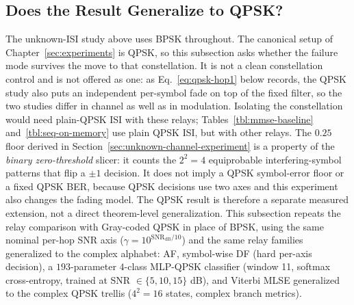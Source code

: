 \subsection{Does the Result Generalize to QPSK?}\label{sec:qpsk-unknown-channel}

The unknown-ISI study above uses BPSK throughout. The canonical setup of Chapter~\ref{sec:experiments} is QPSK, so this subsection asks whether the failure mode survives the move to that constellation. It is not a clean constellation control and is not offered as one: as Eq.~\eqref{eq:qpsk-hop1} below records, the QPSK study also puts an independent per-symbol fade on top of the fixed filter, so the two studies differ in channel as well as in modulation. Isolating the constellation would need plain-QPSK ISI with these relays; Tables~\ref{tbl:mmse-baseline} and~\ref{tbl:seq-on-memory} use plain QPSK ISI, but with other relays. The $0.25$ floor derived in Section~\ref{sec:unknown-channel-experiment} is a property of the \emph{binary zero-threshold} slicer: it counts the $2^{2}=4$ equiprobable interfering-symbol patterns that flip a $\pm1$ decision. It does not imply a QPSK symbol-error floor or a fixed QPSK BER, because QPSK decisions use two axes and this experiment also changes the fading model. The QPSK result is therefore a separate measured extension, not a direct theorem-level generalization. This subsection repeats the relay comparison with Gray-coded QPSK in place of BPSK, using the same nominal per-hop SNR axis ($\gamma=10^{\text{SNR}_{\text{dB}}/10}$) and the same relay families generalized to the complex alphabet: AF, symbol-wise DF (hard per-axis decision), a $193$-parameter $4$-class MLP-QPSK classifier (window 11, softmax cross-entropy, trained at SNR $\in\{5,10,15\}$ dB), and Viterbi MLSE generalized to the complex QPSK trellis ($4^{2}=16$ states, complex branch metrics).

